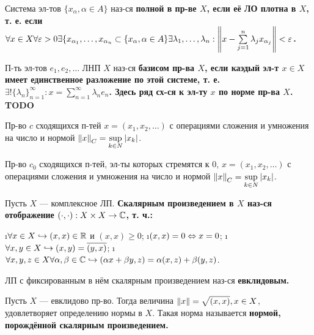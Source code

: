 \begin{defn}
Система эл-тов $\{x_\alpha, \alpha \in A\}$ наз-ся \bf{полной} в пр-ве $X$, если её ЛО плотна в $X$, т. е. если $\forall x \in X \forall \varepsilon > 0 \exists \{x_{\alpha_1}, \dots, x_{\alpha_n} \subset \{x_\alpha, \alpha \in A\} \exists \lambda_1, \dots, \lambda_n: \left\lVert x-\sum\limits_{j=1}^n \lambda_j x_{\alpha_j}\right\rVert < \varepsilon$.
\end{defn}

\begin{defn}
П-ть эл-тов $e_1, e_2, \dots$ ЛНП $X$ наз-ся \bf{базисом} пр-ва $X$, если каэдый эл-т $x \in X$ имеет единственное разложение по этой системе, т. е. $\exists ! \{\lambda_n\}_{n=1}^\infty: x = \sum\limits_{n=1}^\infty \lambda_n e_n$. Здесь ряд сх-ся к эл-ту $x$ по норме пр-ва $X$. TODO
\end{defn}

\begin{defn}
Пр-во $c$ сходящихся п-тей $x=(x_1, x_2, \dots)$ с операциями сложения и умножения на число и нормой $\left\lVert x\right\rVert_C = \sup\limits_{k \in N} |x_k|$.
\end{defn}

\begin{defn}
Пр-во $c_0$ сходящихся п-тей, эл-ты которых стремятся к 0, $x=(x_1, x_2, \dots)$ с операциями сложения и умножения на число и нормой $\left\lVert x\right\rVert_C = \sup\limits_{k \in N} |x_k|$.
\end{defn}

\begin{defn}
Пусть $X$ --- комплексное ЛП. \bf{Скалярным произведением} в $X$ наз-ся отображение $(\cdot, \cdot): X \times X \rightarrow \mathbb{C}$, т. ч.:
\begin{enumerate}
\i $\forall x \in X \hookrightarrow (x, x) \in \mathbb{R}$ и $(x, x) \ge 0$;
\i $(x, x)=0 \Leftrightarrow x = 0$;
\i $\forall x, y \in X \hookrightarrow (x, y) = \overline{(y, x)}$;
\i $\forall x, y, z \in X \forall \alpha, \beta \in \mathbb{C} \hookrightarrow (\alpha x + \beta y, z) = \alpha (x, z) + \beta(y, z)$.
\end{enumerate}
\end{defn}

\begin{defn}
ЛП с фиксированным в нём скалярным произведением наз-ся \bf{евклидовым}.
\end{defn}

\begin{stmt}
Пусть $X$ --- евклидово пр-во. Тогда величина $\left\lVert x\right\rVert = \sqrt{(x, x)}, x \in X$, удовлетворяет определению нормы в $X$. Такая норма называется \bf{нормой, порождённой скалярным произведением}. 
\end{stmt}

